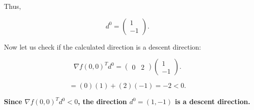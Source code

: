 \documentclass{article}
\begin{document}
Thus,

\begin{equation}
d^0 = \begin{pmatrix} 1 \\ -1 \end{pmatrix}.
\end{equation}

Now let us check if the calculated direction is a descent direction:

\begin{equation}
\nabla f(0,0)^T d^0 = \begin{pmatrix} 0 & 2 \end{pmatrix} \begin{pmatrix} 1 \\ -1 \end{pmatrix}.
\end{equation}

\begin{equation}
= (0)(1) + (2)(-1) = -2 < 0.
\end{equation}

\textbf{Since \( \nabla f(0,0)^T d^0 < 0 \), the direction \( d^0 = (1,-1) \) is a descent direction.}
\end{document}
